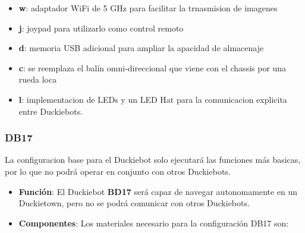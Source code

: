 \documentclass[12pt]{article}
\begin{document}
\begin{itemize}

	\item \textbf{w}: adaptador WiFi de 5 GHz para facilitar la trnasmision de imagenes
	\item \textbf{j}: joypad para utilizarlo como control remoto 
	\item \textbf{d}: memoria USB adicional para ampliar la apacidad de almacenaje
	\item \textbf{c}: se reemplaza el balín omni-direccional que viene con el chassis por una rueda loca 
	\item \textbf{l}: implementacion de LEDs y un LED Hat para la comunicacion explicita entre Duckiebots. 

\end{itemize}

\subsubsection{DB17}

La configuracion base para el Duckiebot solo ejecutará las funciones más basicas, por lo que no podrá operar en conjunto con otros Duckiebots. 

\begin{itemize}

	\item \textbf{Función}: El Duckiebot \textbf{BD17} será capaz de navegar autonomamente en un Duckietown, pero no se podrá comunicar con otros Duckiebots.
	\item \textbf{Componentes}: Los materiales necesario para la configuración DB17 son:
 
\end{itemize}
\end{document}

